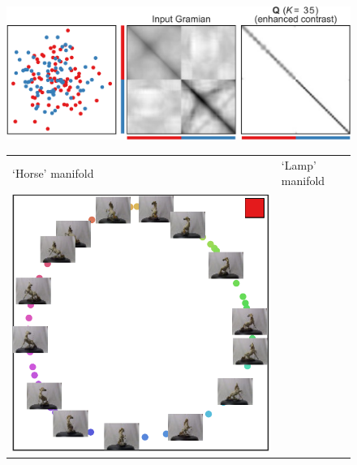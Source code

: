 \documentclass[twoside,11pt]{article}
\begin{document}
\begin{figure}[p]
	\centering
	\begin{minipage}[t]{.59\textwidth}
    	\vspace{0pt}
		\centering
		\includegraphics[width=\linewidth]{cluster-embedding/turntable_solution_35}
	\end{minipage}%
	\hfill
	\begin{minipage}[t]{.39\textwidth}
    	\vspace{0pt}
		\centering
        \begin{tabu} to 
			{\scriptsize `Horse' manifold} &
            {\scriptsize `Lamp' manifold} \\	
			\includegraphics[width=\linewidth]{cluster-embedding/turntable_embedding_35_cluster0} &

\end{tabu}
\end{minipage}
\end{figure}
\end{document}
